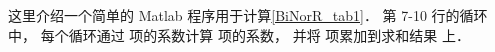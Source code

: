 
这里介绍一个简单的 Matlab 程序用于计算\autoref{BiNorR_tab1}． 第 7-10 行的循环中， 每个循环通过  项的系数计算  项的系数， 并将  项累加到求和结果  上．

